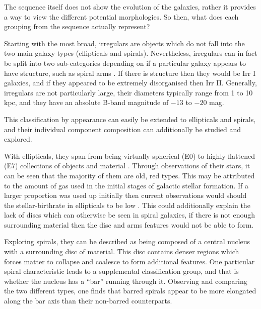 \documentclass[12pt, twocolumn]{revtex4}    %
\begin{document}
The sequence itself does not show the evolution of the galaxies, rather it provides a way to view the different potential morphologies. So then, what does each grouping from the sequence actually represent? 

Starting with the most broad, irregulars are objects which do not fall into the two main galaxy types (ellipticals and spirals). Nevertheless, irregulars can in fact be split into two sub-categories depending on if a particular galaxy appears to have structure, such as spiral arms \citep{carroll_astro}. If there is structure then they would be Irr I galaxies, and if they appeared to be extremely disorganised then Irr II. Generally, irregulars are not particularly large, their diameters typically range from 1 to 10 kpc, and they have an absolute B-band magnitude of $-13$ to $-20$ mag.


This classification by appearance can easily be extended to ellipticals and spirals, and their individual component composition can additionally be studied and explored. 

With ellipticals, they span from being virtually spherical (E0) to highly flattened (E7) collections of objects and material \citep{moore_databook}. Through observations of their stars, it can be seen that the majority of them are old, red types. This may be attributed to the amount of gas used in the initial stages of galactic stellar formation. If a larger proportion was used up initially then current observations would should the stellar-birthrate in ellipticals to be low \citep{carroll_astro}. This could additionally explain the lack of discs which can otherwise be seen in spiral galaxies, if there is not enough surrounding material then the disc and arms features would not be able to form.

Exploring spirals, they can be described as being composed of a central nucleus with a surrounding disc of material. This disc contains denser regions which forces matter to collapse and coalesce to form additional features. One particular spiral characteristic leads to a supplemental classification group, and that is whether the nucleus has a ``bar'' running through it. Observing and comparing the two different types, one finds that barred spirals appear to be more elongated along the bar axis than their non-barred counterparts. 
\end{document}
